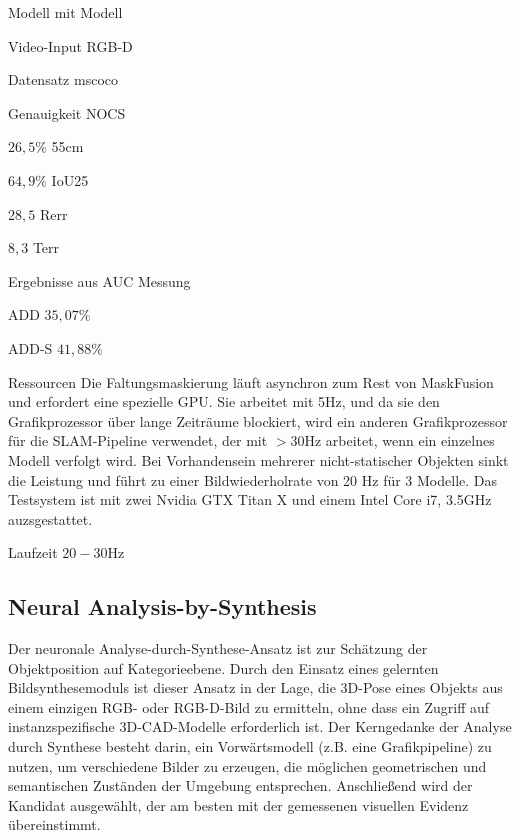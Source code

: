 \documentclass[a4paper, 11pt]{article}
\begin{document}
\begin{multicols*}{2}
    \begin{description*}
        \item[Modell] mit Modell
        \item[Video-Input] RGB-D
        \item[Datensatz] \Gls{mscoco}
        \item[Genauigkeit] \Gls{NOCS}
        \begin{itemize*}
            \item $26,5\%$ \Gls{55cm}
            \item $64,9\%$ \Gls{IoU25}
            \item $28,5$ \Gls{Rerr}
            \item $8,3$ \Gls{Terr}
        \end{itemize*}
        Ergebnisse aus \Gls{AUC} Messung
        \begin{itemize*}
            \item ADD $35,07\%$
            \item ADD-S $41,88\%$
        \end{itemize*}
        \item[Ressourcen] Die Faltungsmaskierung läuft asynchron zum Rest von MaskFusion und erfordert eine spezielle GPU. Sie arbeitet mit 5Hz, und da sie den Grafikprozessor über lange Zeiträume blockiert, wird  ein anderen Grafikprozessor für die SLAM-Pipeline verwendet, der mit $>30$Hz arbeitet, wenn ein einzelnes Modell verfolgt wird. Bei Vorhandensein mehrerer nicht-statischer Objekten sinkt die Leistung und führt zu einer Bildwiederholrate von 20 Hz für 3 Modelle. Das Testsystem ist mit zwei Nvidia GTX Titan X und einem Intel Core i7, 3.5GHz auzsgestattet.
        \item[Laufzeit] $20-30$Hz
    \end{description*}

    \subsection{Neural Analysis-by-Synthesis}
    Der neuronale Analyse-durch-Synthese-Ansatz \cite{CategoryLevelObject} ist zur Schätzung der Objektposition auf Kategorieebene.
    Durch den Einsatz eines gelernten Bildsynthesemoduls ist dieser Ansatz in der Lage, die 3D-Pose eines Objekts aus einem einzigen RGB- oder RGB-D-Bild zu ermitteln, ohne dass ein Zugriff auf instanzspezifische 3D-CAD-Modelle erforderlich ist.
    Der Kerngedanke der Analyse durch Synthese besteht darin, ein Vorwärtsmodell (z.B. eine Grafikpipeline) zu nutzen, um verschiedene Bilder zu erzeugen, die möglichen geometrischen und semantischen Zuständen der Umgebung entsprechen. Anschließend wird der Kandidat ausgewählt, der am besten mit der gemessenen visuellen Evidenz übereinstimmt.


\end{multicols*}
\end{document}
